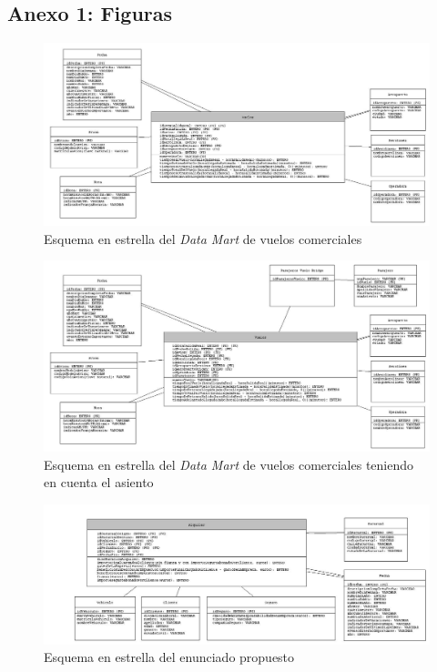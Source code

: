 \documentclass{article}
\begin{document}
\newpage
\begin{landscape}
\section{Anexo 1: Figuras}
\begin{figure}[h!]
    \centering
    \includegraphics[scale = 0.4]{images/esquema_estrella_1.jpg}
    \caption{Esquema en estrella del \textit{Data Mart} de vuelos comerciales}
    \label{fig:esquema_estrella_1}
\end{figure}
\end{landscape}

\newpage
\begin{landscape}
\begin{figure}
    \centering
    \includegraphics[scale=0.4]{images/p2_2.jpg}
    \caption{Esquema en estrella del \textit{Data Mart} de vuelos comerciales teniendo en cuenta el asiento}
    \label{fig:esquema_estrella_asiento}
\end{figure}
\end{landscape}

\newpage
\begin{landscape}
\begin{figure}[h!]
    \centering
    \includegraphics[scale=0.4]{images/esquema_estrella_alquiler.jpg}
    \caption{Esquema en estrella del enunciado propuesto}
    \label{fig:esquema_estrella_alquiler}
\end{figure}
\end{landscape}
\end{document}
